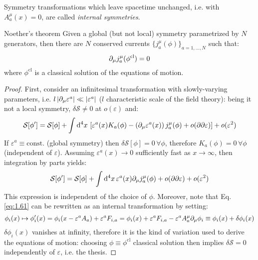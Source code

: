 Symmetry transformations which leave spacetime unchanged, i.e. with $ A^\mu_a(x) = 0 $, are called \textit{internal symmetries}.

\begin{theorem}{Noether's theorem}{}
  Given a global (but not local) symmetry parametrized by $ N $ generators, then there are $ N $ conserved currents $ \{j^\mu_a(\phi)\}_{a = 1, \dots, N} $ such that:
  \begin{equation}
    \partial_\mu j^\mu_a(\phi^\mathrm{cl}) = 0
    \label{eq:1.62}
  \end{equation}
  where $ \phi^\mathrm{cl} $ is a classical solution of the equations of motion.

  \tcblower

  \begin{proof}
    First, consider an infinitesimal transformation with slowly-varying parameters, i.e. $ l \left\lvert\partial_\mu \varepsilon^a\right\rvert \ll \left\lvert\varepsilon^a\right\rvert $ ($ l $ characteristic scale of the field theory): being it not a local symmetry, $ \delta \mathcal{S} \neq 0 $ at $ o(\varepsilon) $ and:
    \begin{equation*}
      \mathcal{S}[\phi'] = \mathcal{S}[\phi] + \int \mathrm{d}^4 x\, \left[ \varepsilon^a(x) K_a(\phi) - \left( \partial_\mu \varepsilon^a(x) \right) j^\mu_a(\phi) + o(\partial \partial \varepsilon) \right] + o(\varepsilon^2)
    \end{equation*}
    If $ \varepsilon^a \equiv \mathrm{const.} $ (global symmetry) then $ \delta \mathcal{S}[\phi] = 0 \,\forall \phi $, therefore $ K_a(\phi) = 0 \,\forall \phi $ (independent of $ \varepsilon $). Assuming $ \varepsilon^a(x) \rightarrow 0 $ sufficiently fast as $ x \rightarrow \infty $, then integration by parts yields:
    \begin{equation*}
      \mathcal{S}[\phi'] = \mathcal{S}[\phi] + \int \mathrm{d}^4 x\, \varepsilon^a(x) \partial_\mu j^\mu_a(\phi) + o(\partial \partial \varepsilon) + o(\varepsilon^2)
    \end{equation*}
    This expression is independent of the choice of $ \phi $. Moreover, note that Eq. \ref{eq:1.61} can be rewritten as an internal transformation by setting:
    \begin{equation*}
      \phi_i(x) \mapsto \phi'_i(x) = \phi_i(x - \varepsilon^a A_a) + \varepsilon^a F_{i,a} = \phi_i(x) + \varepsilon^a F_{i,a} - \varepsilon^a A^\mu_a \partial_\mu \phi_i \equiv \phi_i(x) + \delta \phi_i(x)
    \end{equation*}
    $ \delta \phi_i(x) $ vanishes at infinity, therefore it is the kind of variation used to derive the equations of motion: choosing $ \phi \equiv \phi^\mathrm{cl} $ classical solution then implies $ \delta \mathcal{S} = 0 $ independently of $ \varepsilon $, i.e. the thesis.
  \end{proof}
\end{theorem}

